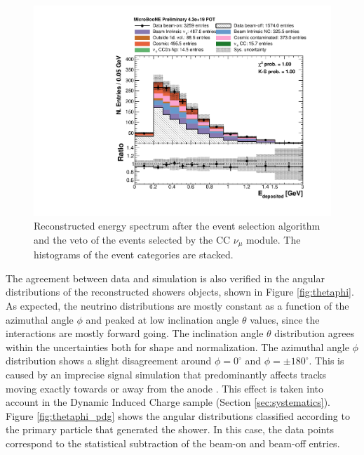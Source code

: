 \begin{figure}[htbp]
\centering
  \includegraphics[width=0.65\linewidth]{figures/h_fixed_energy.pdf}
  \caption{Reconstructed energy spectrum after the event selection algorithm and the veto of the events selected by the CC $\nu_{\mu}$ module. The histograms of the event categories are stacked.}
  \label{fig:spectrum}
\end{figure}

The agreement between data and simulation is also verified in the angular distributions of the reconstructed showers objects, shown in Figure \ref{fig:thetaphi}. As expected, the neutrino distributions are mostly constant as a function of the azimuthal angle $\phi$ and peaked at low inclination angle $\theta$ values, since the interactions are mostly forward going. The inclination angle $\theta$ distribution agrees within the uncertainties both for shape and normalization. The azimuthal angle $\phi$ distribution shows a slight disagreement around $\phi = 0^{\circ}$ and $\phi = \pm180^{\circ}$. {This is caused by an imprecise signal simulation that predominantly affects tracks moving exactly towards or away from the anode \cite{signal1, signal2}. This effect is taken into account in the Dynamic Induced Charge sample (Section \ref{sec:systematics}). Figure \ref{fig:thetaphi_pdg} shows the angular distributions classified according to the primary particle that generated the shower. In this case, the data points correspond to the statistical subtraction of the beam-on and beam-off entries.}

